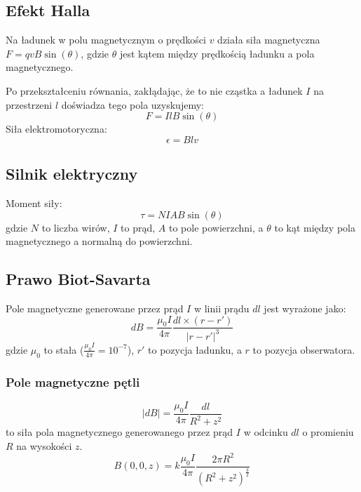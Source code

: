 \documentclass{../notatki}
\begin{document}
\subsection{Efekt Halla}

Na ładunek w polu magnetycznym o prędkości $v$ działa siła
magnetyczna $F = qvB \sin(\theta)$, gdzie $\theta$ jest kątem między
prędkością ładunku a pola magnetycznego.

\begin{figure}[h]
  \centering
\end{figure}

Po przekształceniu równania, zakłądając, że to nie cząstka a ładunek $I$ na
przestrzeni $l$ doświadza tego pola uzyskujemy:
$$
F = IlB \sin(\theta)
$$
Siła elektromotoryczna:
$$
\epsilon = Blv
$$

\subsection{Silnik elektryczny}

Moment siły:
$$
\tau = NIAB \sin(\theta)
$$
gdzie $N$ to liczba wirów, $I$ to prąd, $A$ to pole powierzchni, a
$\theta$ to kąt między pola magnetycznego a normalną do powierzchni.

\subsection{Prawo Biot-Savarta}

Pole magnetyczne generowane przez prąd $I$ w linii prądu $dl$ jest
wyrażone jako:
$$
dB = \frac{\mu_0 I}{4 \pi} \frac{dl \times (r - r')}{|r - r'|^3}
$$
gdzie $\mu_0$ to stała ($\frac{\mu_0 I}{4 \pi} = 10^{-7}$), $r'$ to pozycja
ładunku, a $r$ to pozycja obserwatora.

\subsubsection{Pole magnetyczne pętli}

$$
|dB| = \frac{\mu_0 I}{4 \pi} \frac{dl}{R^2 + z^2}
$$
to siła pola magnetycznego generowanego przez prąd $I$ w odcinku $dl$
o promieniu $R$ na wysokości $z$.
$$
B(0, 0, z) = k \frac{\mu_0 I}{4 \pi} \frac{2 \pi R^2}{(R^2 + z^2)^{\frac{3}{2}}}
$$
\end{document}
